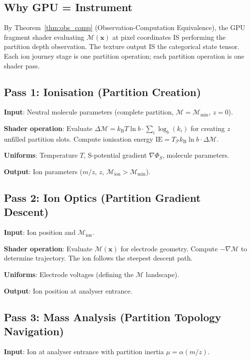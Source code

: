 \documentclass[11pt,twocolumn,a4paper]{article}
\theoremstyle{definition}
\theoremstyle{remark}
\newcommand{\kB}{k_{\mathrm{B}}}
\newcommand{\Depth}{\mathcal{M}}
\newcommand{\partinert}{\mu}
\newcommand{\Spotential}{\Phi_S}
\begin{document}
\subsection{Why GPU = Instrument}

By Theorem~\ref{thm:obs_comp} (Observation-Computation Equivalence), the GPU fragment shader evaluating $\Depth(\mathbf{x})$ at pixel coordinates IS performing the partition depth observation. The texture output IS the categorical state tensor. Each ion journey stage is one partition operation; each partition operation is one shader pass.

\subsection{Pass 1: Ionisation (Partition Creation)}

\textbf{Input}: Neutral molecule parameters (complete partition, $\Depth = \Depth_{\min}$, $z = 0$).

\textbf{Shader operation}: Evaluate $\Delta\Depth = \kB T \ln b \cdot \sum_i \log_b(k_i)$ for creating $z$ unfilled partition slots. Compute ionisation energy $\mathrm{IE} = T_{\mathcal{P}}\kB\ln b \cdot \Delta\Depth$.

\textbf{Uniforms}: Temperature $T$, S-potential gradient $\nabla\Spotential$, molecule parameters.

\textbf{Output}: Ion parameters ($m/z$, $z$, $\Depth_{\mathrm{ion}} > \Depth_{\min}$).

\subsection{Pass 2: Ion Optics (Partition Gradient Descent)}

\textbf{Input}: Ion position and $\Depth_{\mathrm{ion}}$.

\textbf{Shader operation}: Evaluate $\Depth(\mathbf{x})$ for electrode geometry. Compute $-\nabla\Depth$ to determine trajectory. The ion follows the steepest descent path.

\textbf{Uniforms}: Electrode voltages (defining the $\Depth$ landscape).

\textbf{Output}: Ion position at analyser entrance.

\subsection{Pass 3: Mass Analysis (Partition Topology Navigation)}

\textbf{Input}: Ion at analyser entrance with partition inertia $\partinert = \alpha(m/z)$.
\end{document}
